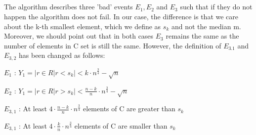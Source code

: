 \documentclass[11pt]{537homework}
\begin{document}
\subsection{}
The algorithm describes three 'bad' events $E_1,E_2$ and $E_3$ such that if they do not happen the algorithm does not fail. In our case, the difference is that we care about the k-th smallest element, which we define as $s_k$ and not the median m. Moreover, we should point out that in both cases $E_3$ remains the same as the number of elements in C set is still the same. However, the definition of $E_{3.1}$ and $E_{3,2}$ has been changed as follows: 
\begin{description}[font=$\bullet$]
\item $E_{1}$ : $Y_1 = |{r \in R | r < s_k}| < k \cdot n^{\frac{3}{4}} - \sqrt{n} $ 
\item $E_{2}$ : $Y_1 = |{r \in R | r > s_k}| < \frac{n-k}{n} \cdot n^{\frac{3}{4}} - \sqrt{n} $ 
\item $E_{3,1}$ : At least $4 \cdot \frac{n-k}{n} \cdot n^{\frac{3}{4}}$ elements of C are greater than $s_k$
\item $E_{3,1}$ : At least $4 \cdot \frac{k}{n} \cdot n^{\frac{3}{4}}$ elements of C are smaller than $s_k$
\end{description}
\end{document}
